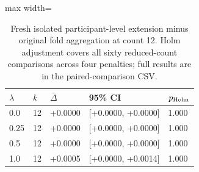 \begin{table}[htbp]
\centering\small
\caption{Fresh isolated participant-level extension minus original fold aggregation at count 12. Holm adjustment covers all sixty reduced-count comparisons across four penalties; full results are in the paired-comparison CSV.}\label{tab:personextension}
\begin{adjustbox}{max width=\textwidth}
\begin{tabular}{lllll}\toprule
$\lambda$ & $k$ & $\bar\Delta$ & 95\% CI & $p_{\rm Holm}$\\\midrule
0.0 & 12 & +0.0000 & [+0.0000, +0.0000] & 1.000\\
0.25 & 12 & +0.0000 & [+0.0000, +0.0000] & 1.000\\
0.5 & 12 & +0.0000 & [+0.0000, +0.0000] & 1.000\\
1.0 & 12 & +0.0005 & [+0.0000, +0.0014] & 1.000\\
\bottomrule\end{tabular}
\end{adjustbox}
\end{table}
